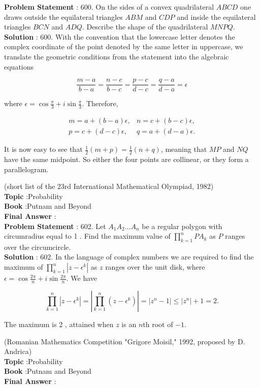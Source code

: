 \documentclass[10pt]{article}
\begin{document}
\textbf{Problem Statement} :
600. On the sides of a convex quadrilateral $A B C D$ one draws outside the equilateral triangles $A B M$ and $C D P$ and inside the equilateral triangles $B C N$ and $A D Q$. Describe the shape of the quadrilateral $M N P Q$.
\\
\textbf{Solution} :
600. With the convention that the lowercase letter denotes the complex coordinate of the point denoted by the same letter in uppercase, we translate the geometric conditions from the statement into the algebraic equations 

$$
\frac{m-a}{b-a}=\frac{n-c}{b-c}=\frac{p-c}{d-c}=\frac{q-a}{d-a}=\epsilon
$$

where $\epsilon=\cos \frac{\pi}{3}+i \sin \frac{\pi}{3}$. Therefore,

$$
\begin{aligned}
m=a+(b-a) \epsilon, & n=c+(b-c) \epsilon, \\
p=c+(d-c) \epsilon, & q=a+(d-a) \epsilon .
\end{aligned}
$$

It is now easy to see that $\frac{1}{2}(m+p)=\frac{1}{2}(n+q)$, meaning that $M P$ and $N Q$ have the same midpoint. So either the four points are collinear, or they form a parallelogram.

(short list of the 23rd International Mathematical Olympiad, 1982)
\\
\textbf{Topic} :Probability\\
\textbf{Book} :Putnam and Beyond\\
\textbf{Final Answer} :\\


\textbf{Problem Statement} :
602. Let $A_{1} A_{2} \ldots A_{n}$ be a regular polygon with circumradius equal to 1 . Find the maximum value of $\prod_{k=1}^{n} P A_{k}$ as $P$ ranges over the circumcircle. 
\\
\textbf{Solution} :
602. In the language of complex numbers we are required to find the maximum of $\prod_{k=1}^{n}\left|z-\epsilon^{k}\right|$ as $z$ ranges over the unit disk, where $\epsilon=\cos \frac{2 \pi}{n}+i \sin \frac{2 \pi}{n}$. We have

$$
\prod_{k=1}^{n}\left|z-\epsilon^{k}\right|=\left|\prod_{k=1}^{n}\left(z-\epsilon^{k}\right)\right|=\left|z^{n}-1\right| \leq\left|z^{n}\right|+1=2 .
$$

The maximum is 2 , attained when $z$ is an $n$th root of $-1$.

(Romanian Mathematics Competition "Grigore Moisil," 1992, proposed by D. Andrica)
\\
\textbf{Topic} :Probability\\
\textbf{Book} :Putnam and Beyond\\
\textbf{Final Answer} :\\
\end{document}
